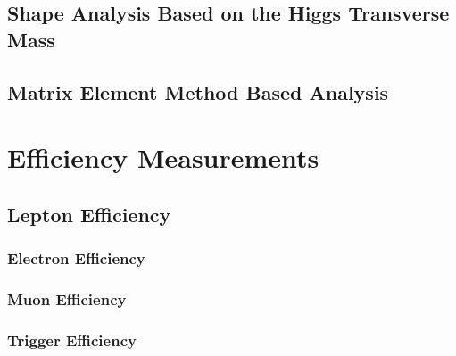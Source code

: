 \documentclass{cmspaper}
\begin{document}

\subsection{Shape Analysis Based on the Higgs Transverse Mass}
\label{sec:anal_mt}

\clearpage

\subsection{Matrix Element Method Based Analysis}
\label{sec:anal_me}


 
%      
%      
%    

\clearpage
\section{Efficiency Measurements}
    \label{sec:alleff}
    \subsection{Lepton Efficiency}
    \label{sec:efficiency}
     
   \subsubsection{Electron Efficiency}
     
       \label{sec:eff_electron}
      \subsubsection{Muon Efficiency}
       
       \label{sec:eff_muon}
        \subsubsection{Trigger Efficiency}
        
        \label{sec:eff_trigger}
%     
\end{document}
